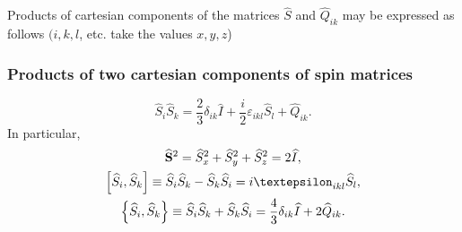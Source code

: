 Products of cartesian components of the matrices $\widehat{S}$ and $\widehat{Q}_{i k}$ may be expressed as follows $(i, k, l$, etc. take the values $x, y, z$)
\subsubsection{Products of two cartesian components of spin matrices}
\begin{equation}
\widehat{S}_{i} \widehat{S}_{k}=\frac{2}{3} \delta_{i k} \widehat{I}+\frac{i}{2} \varepsilon_{i k l} \widehat{S}_{l}+\widehat{Q}_{i k}. \label{eq:2:6:38}
\end{equation}
In particular,
\begin{gather}
\widehat{\vect{S}}^{2}=\widehat{S}_{x}^{2}+\widehat{S}_{y}^{2}+\widehat{S}_{z}^{2}=2 \widehat{I} , \label{eq:2:6:39}\\
{\left[\widehat{S}_{i}, \widehat{S}_{k}\right] \equiv \widehat{S}_{i} \widehat{S}_{k}-\widehat{S}_{k} \widehat{S}_{i}=i \varepsilon_{i k l} \widehat{S}_{l}} , \label{eq:2:6:40}\\
\left\{\widehat{S}_{i}, \widehat{S}_{k}\right\} \equiv \widehat{S}_{i} \widehat{S}_{k}+\widehat{S}_{k} \widehat{S}_{i}=\frac{4}{3} \delta_{i k} \widehat{I}+2 \widehat{Q}_{i k}. \label{eq:2:6:41}
\end{gather}
